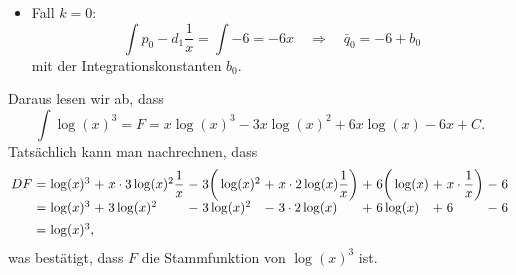 \begin{loesung}
\begin{itemize}
\item
Fall $k=0$:
\[
\int p_0 - d_1\frac{1}{x}
=
\int -6
=
-6x
\quad\Rightarrow\quad
\bar{q}_0 = -6 + b_0
\]
mit der Integrationskonstanten $b_0$.
\end{itemize}
Daraus lesen wir ab, dass
\[
\int \log(x)^3
=
F
=
x\log(x)^3
-3x\log(x)^2
+6x\log(x)
-6x
+C.
\]
Tatsächlich kann man nachrechnen, dass
\[
\renewcommand{\arraycolsep}{1.5pt}
\begin{array}{lclclclclclclcl}
DF &=& 
\log(x)^3 &+& x\cdot 3\log(x)^2\displaystyle\frac{1}{x}
&-& 3\bigg(
\log(x)^2 &+& x\cdot 2\log(x)\displaystyle\frac{1}{x}
\bigg)
&+& 6\bigg(
\log(x) &+& x\cdot \displaystyle\frac{1}{x}
\bigg)
&-& 6
\\
   &=& \log(x)^3 &+& 3\log(x)^2 &-& 3 \log(x)^2 &-& 3\cdot 2\log(x) &+& 6 \log(x) &+& 6 &-& 6
\\[5pt]
 &=& \log(x)^3\rlap{,}&& && && && && &&
\end{array}
\]
was bestätigt, dass $F$ die Stammfunktion von $\log(x)^3$ ist.
\end{loesung}

